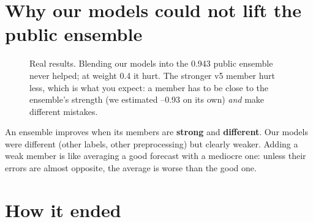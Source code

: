 \section{Why our models could not lift the public ensemble}

\begin{figure}[H]
\centering
{}
\caption{Real results. Blending our models into the 0.943 public ensemble never helped; at weight 0.4 it hurt. The
stronger v5 member hurt less, which is what you expect: a member has to be close to the ensemble's strength (we
estimated --0.93 on its own) \emph{and} make different mistakes.}
\label{fig:memberweight}
\end{figure}

\begin{keyidea}
An ensemble improves when its members are \textbf{strong} and \textbf{different}. Our models were different
(other labels, other preprocessing) but clearly weaker. Adding a weak member is like averaging a good forecast with
a mediocre one: unless their errors are almost opposite, the average is worse than the good one.
\end{keyidea}

\section{How it ended}

